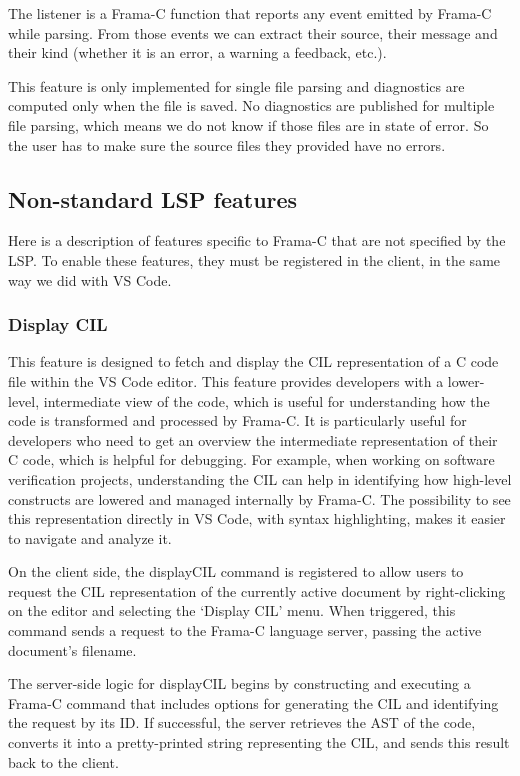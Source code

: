 \documentclass[10pt]{article}
\begin{document}
\begin{singlespace}
The listener is a Frama-C function that reports any event emitted by Frama-C while parsing. From those events we can extract their source, their message and their kind (whether it is an error, a warning a feedback, etc.).

This feature is only implemented for single file parsing and diagnostics are computed only when the file is saved. No diagnostics are published for multiple file parsing, which means we do not know if those files are in state of error. So the user has to make sure the source files they provided have no errors.


\subsection{Non-standard LSP features}
Here is a description of features specific to Frama-C that are not specified by the LSP. To enable these features, they must be registered in the client, in the same way we did with VS Code.

\subsubsection{Display CIL}
This feature is designed to fetch and display the CIL representation of a C code file within the VS Code editor. This feature provides developers with a lower-level, intermediate view of the code, which is useful for understanding how the code is transformed and processed by Frama-C. It is particularly useful for developers who need to get an overview the intermediate representation of their C code, which is helpful for debugging. For example, when working on software verification projects, understanding the CIL can help in identifying how high-level constructs are lowered and managed internally by Frama-C. The possibility to see this representation directly in VS Code, with syntax highlighting, makes it easier to navigate and analyze it.

On the client side, the displayCIL command is registered to allow users to request the CIL representation of the currently active document by right-clicking on the editor and selecting the `Display CIL' menu. When triggered, this command sends a request to the Frama-C language server, passing the active document's filename.

The server-side logic for displayCIL begins by constructing and executing a Frama-C command that includes options for generating the CIL and identifying the request by its ID. If successful, the server retrieves the AST of the code, converts it into a pretty-printed string representing the CIL, and sends this result back to the client.


\end{singlespace}
\end{document}
